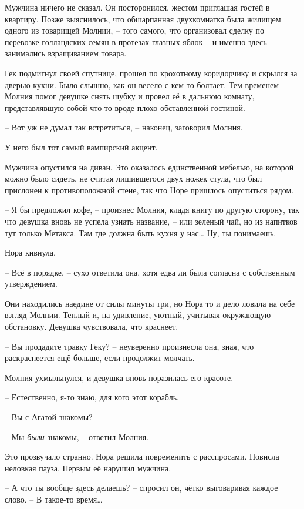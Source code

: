 \documentclass[
  a5paperpaper,
  DIV=11,
  numbers=noendperiod]{scrreprt}
\begin{document}
Мужчина ничего не сказал. Он посторонился, жестом приглашая гостей в
квартиру. Позже выяснилось, что обшарпанная двухкомнатка была жилищем
одного из товарищей Молнии, -- того самого, что организовал сделку по
перевозке голландских семян в протезах глазных яблок -- и именно здесь
занимались взращиванием товара.

Гек подмигнул своей спутнице, прошел по крохотному коридорчику и скрылся
за дверью кухни. Было слышно, как он весело с кем-то болтает. Тем
временем Молния помог девушке снять шубку и провел её в дальнюю комнату,
представлявшую собой что-то вроде плохо обставленной гостиной.

-- Вот уж не думал так встретиться, -- наконец, заговорил Молния.

У него был тот самый вампирский акцент.

Мужчина опустился на диван. Это оказалось единственной мебелью, на
которой можно было сидеть, не считая лишившегося двух ножек стула, что
был прислонен к противоположной стене, так что Норе пришлось опуститься
рядом.

-- Я бы предложил кофе, -- произнес Молния, кладя книгу по другую
сторону, так что девушка вновь не успела узнать название, -- или зеленый
чай, но из напитков тут только Метакса. Там где должна быть кухня у
нас\ldots{} Ну, ты понимаешь.

Нора кивнула.

-- Всё в порядке, -- сухо ответила она, хотя едва ли была согласна с
собственным утверждением.

Они находились наедине от силы минуты три, но Нора то и дело ловила на
себе взгляд Молнии. Теплый и, на удивление, уютный, учитывая окружающую
обстановку. Девушка чувствовала, что краснеет.

-- Вы продадите травку Геку? -- неуверенно произнесла она, зная, что
раскраснеется ещё больше, если продолжит молчать.

Молния ухмыльнулся, и девушка вновь поразилась его красоте.

-- Естественно, я-то знаю, для кого этот корабль.

-- Вы с Агатой знакомы?

-- Мы \emph{были} знакомы, -- ответил Молния.

Это прозвучало странно. Нора решила повременить с расспросами. Повисла
неловкая пауза. Первым её нарушил мужчина.

-- А что ты вообще здесь делаешь? -- спросил он, чётко выговаривая
каждое слово. -- В такое-то время\ldots{}
\end{document}
